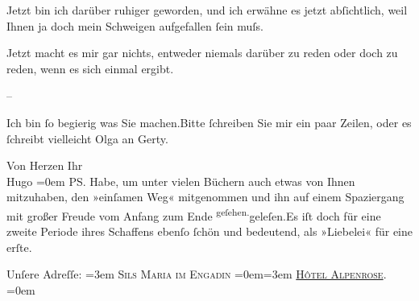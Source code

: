 \pstart
           Jetzt bin ich darüber ruhiger geworden, und ich erwähne es jetzt abſichtlich, weil
               Ihnen ja doch mein Schweigen aufgefallen{ }ſein muſs.\pend
           
\pstart
           Jetzt macht es mir gar nichts, {\pb}entweder niemals darüber zu reden oder doch zu reden, wenn es sich einmal
               ergibt.\pend
           
\pstart
           \numberlinefalse{}–\numberlinetrue{}\pend
           
\pstart
           Ich bin{ }ſo begierig was Sie machen.\hspace*{1.5em}Bitte{ }ſchreiben
               Sie mir ein paar Zeilen, oder es{ }ſchreibt vielleicht Olga an Gerty.\pend
           
\pstart
           Von Herzen Ihr{\\[\baselineskip]}\spacefill\mbox{Hugo}\pend
           \leftskip=0em{}
\pstart
           \noindent{}PS. Habe, um unter vielen Büchern auch etwas von Ihnen mitzuhaben, den »einſamen Weg« mitgenommen und ihn auf einem
                  Spaziergang mit großer Freude vom Anfang zum Ende \substVorne{}\textsuperscript{geſehen.}\substDazwischen{}geleſen.\substHinten{}\hspace*{1.5em}Es iſt doch für eine zweite Periode ihres
                  Schaffens ebenſo{ }ſchön und bedeutend, als {\pb}»Liebelei« für eine erſte.\pend
           
\pstart
           Unſere Adreſſe:\pend
           \leftskip=3em{}
\pstart
           \noindent{}\textsc{Sils Maria im Engadin}\pend
           \leftskip=0em{}\leftskip=3em{}
\pstart
           \textsc{\uline{Hôtel Alpenrose}}.\pend
           \leftskip=0em{}\endnumbering{}  \newcommand{\dateiname}{L01785}\newcommand{\titel}{Hugo von Hofmannsthal an Arthur Schnitzler, 24. 7. [1908]}\newcommand{\editorInnen}{Martin Anton Müller und Gerd-Hermann Susen}
